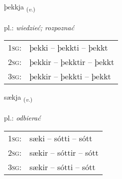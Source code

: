 \documentclass[frontgrid, backgrid]{flacards}\usepackage[]{graphicx}\usepackage[]{xcolor}
\begin{document}
\renewcommand{\flhead}{\vskip5pt \fboxsep=0pt {\small\bfseries\footnotesize Sagnorð | Verb}}
\renewcommand{\fcfoot}{\vskip5pt \fboxsep=0pt \hspace{2pt}{\small\bfseries\footnotesize 1K}}

\renewcommand{\blhead}{\vskip5pt {\small\bfseries\footnotesize Sagnorð | Verb }}
\renewcommand{\bcfoot}{\vskip5pt \hspace{2pt}{\small\bfseries\footnotesize 1K}}


{þekkja \small{\textsubscript{(\textit{v.})}} \\[1ex] %
\textphonetic{[θɛhca]} \\
pl.: \emph{wiedzieć; rozpoznać} \\  [2ex]
\renewcommand*{\arraystretch}{0.8}
\begin{tabular}{p{1cm}l}
\textsc{1sg}: & þekki -- þekkti -- þekkt \\ 
\textsc{2sg}: & þekkir -- þekktir -- þekkt \\ 
\textsc{3sg}: & þekkir -- þekkti -- þekkt \\ 
\end{tabular}
}

\renewcommand{\flhead}{\vskip5pt \fboxsep=0pt {\small\bfseries\footnotesize Sagnorð | Verb}}
\renewcommand{\fcfoot}{\vskip5pt \fboxsep=0pt \hspace{2pt}{\small\bfseries\footnotesize 1K}}

\renewcommand{\blhead}{\vskip5pt {\small\bfseries\footnotesize Sagnorð | Verb }}
\renewcommand{\bcfoot}{\vskip5pt \hspace{2pt}{\small\bfseries\footnotesize 1K}}


{sækja \small{\textsubscript{(\textit{v.})}} \\[1ex] %
\textphonetic{[saiːca]} \\
pl.: \emph{odbierać} \\  [2ex]
\renewcommand*{\arraystretch}{0.8}
\begin{tabular}{p{1cm}l}
\textsc{1sg}: & sæki -- sótti -- sótt \\ 
\textsc{2sg}: & sækir -- sóttir -- sótt \\ 
\textsc{3sg}: & sækir -- sótti -- sótt \\ 
\end{tabular}
}
\end{document}

